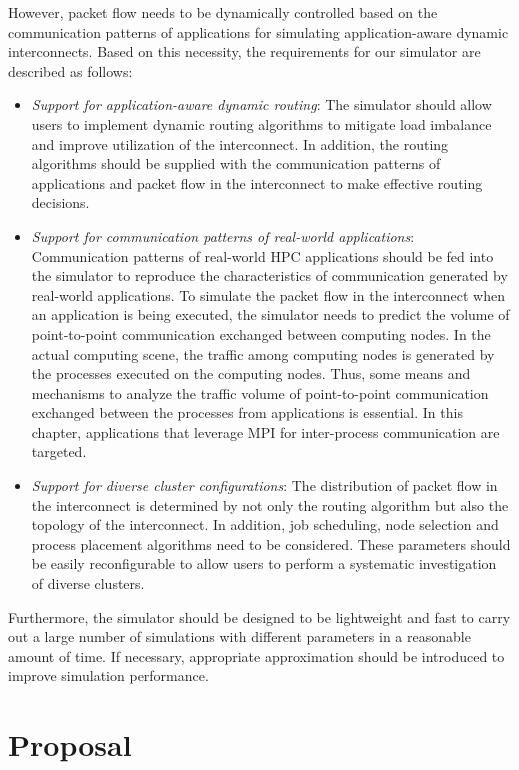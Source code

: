 However, packet flow needs to be dynamically controlled based on the
communication patterns of applications for simulating application-aware
dynamic interconnects. Based on this necessity, the requirements for our
simulator are described as follows:

\begin{itemize}
\item
  \emph{Support for application-aware dynamic routing}: The simulator
  should allow users to implement dynamic routing algorithms to mitigate
  load imbalance and improve utilization of the interconnect. In
  addition, the routing algorithms should be supplied with the
  communication patterns of applications and packet flow in the
  interconnect to make effective routing decisions.
\item
  \emph{Support for communication patterns of real-world applications}:
  Communication patterns of real-world HPC applications should be fed
  into the simulator to reproduce the characteristics of communication
  generated by real-world applications. To simulate the packet flow in
  the interconnect when an application is being executed, the simulator
  needs to predict the volume of point-to-point communication exchanged
  between computing nodes. In the actual computing scene, the traffic
  among computing nodes is generated by the processes executed on the
  computing nodes. Thus, some means and mechanisms to analyze the
  traffic volume of point-to-point communication exchanged between the
  processes from applications is essential. In this chapter, applications
  that leverage MPI for inter-process communication are targeted.
\item
  \emph{Support for diverse cluster configurations}: The distribution of
  packet flow in the interconnect is determined by not only the routing
  algorithm but also the topology of the interconnect. In addition, job
  scheduling, node selection and process placement algorithms need to be
  considered. These parameters should be easily reconfigurable to allow
  users to perform a systematic investigation of diverse clusters.
\end{itemize}

Furthermore, the simulator should be designed to be lightweight and fast
to carry out a large number of simulations with different parameters in
a reasonable amount of time. If necessary, appropriate approximation
should be introduced to improve simulation performance.

\section{Proposal}\label{ii-proposal}

